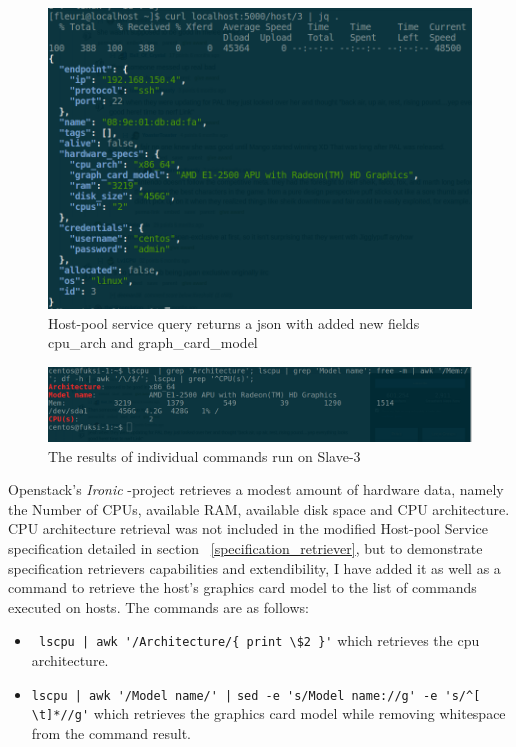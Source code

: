  \begin{figure}[ht!]
\centering
  \includegraphics[width=\textwidth, keepaspectratio]{masterqueryscreenshot.png}%
  \caption{Host-pool service query returns a json with added new fields cpu\_arch and graph\_card\_model}
  \label{fig:master_query}
\end{figure}

 \begin{figure}[ht!]
\centering
  \includegraphics[width=\textwidth, keepaspectratio]{slave_3_specs_screenshot.png}%
  \caption{The results of individual commands run on Slave-3}
  \label{fig:slave_3_specs}
\end{figure}

Openstack's \textit{Ironic} -project\cite{ironic_troubleshoot} retrieves a modest amount of hardware data, namely the Number of CPUs, available RAM, available disk space and CPU architecture. CPU architecture retrieval was not included in the modified Host-pool Service specification detailed in section ~\ref{specification_retriever}, but to demonstrate specification retrievers capabilities and extendibility, I have added it as well as a command to retrieve the host's graphics card model to the list of commands executed on hosts. The commands are as follows:

\begin{itemize}
\item \verb= lscpu | awk '/Architecture/{ print \$2 }'= which retrieves the cpu architecture.
\item \verb=lscpu | awk '/Model name/' |= \linebreak \verb=sed -e 's/Model name://g' -e 's/^[ \t]*//g'= which retrieves the graphics card model while removing whitespace from the command result.
\end{itemize}

